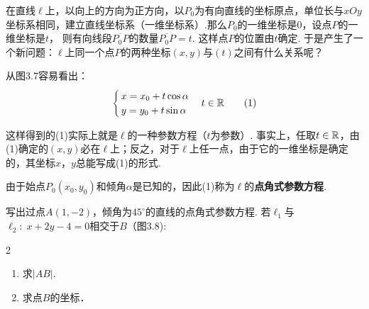 \noindent
\begin{minipage}{.52\textwidth}\CTEXindent
    在直线$\ell$上，以向上的方向为正方向，以$P_0$为有向直线的坐标原点，单位长与$xOy$坐标系相同，建立直线坐标系（一维坐标系）.那么$P_0$的一维坐标是0，设点$P$的一维坐标是$t$，
    则有向线段$\overline{P_0P}$的数量$\overline{P_0P}=t$. 这样点$P$的位置由$t$确定. 于是产生了一个新问题：$\ell$上同一个点$P$的两种坐标$(x,y)$与$(t)$之间有什么关系呢？
\end{minipage}
\hfill
\begin{minipage}{.45\textwidth}
\centering
{}
\end{minipage}

从图3.7容易看出：
\begin{equation}
    \begin{cases}
        x=x_0+t\cos\alpha\\
        y=y_0+t\sin\alpha
    \end{cases}t\in\mathbb{R}  \tag{1}
\end{equation}

这样得到的(1)实际上就是$\ell$的一种参数方程（$t$为参数）. 事实上，任取$t\in\mathbb{R}$，由(1)确定的$(x,y)$必在$\ell$上；反之，对于$\ell$上任一点，由于它的一维坐标是确定的，其坐标$x$，$y$总能写成(1)的形式.

由于始点$P_0(x_0,y_0)$和倾角$\alpha$是已知的，因此(1)称为$\ell$的\textbf{点角式参数方程}.

\begin{example}
写出过点$A(1,-2)$，倾角为$45^{\circ}$的直线的点角式参数方程. 若$\ell_1$与$\ell_2:\; x+2y-4=0$相交于$B$（图3.8):
\begin{multicols}{2}
    \begin{enumerate}[(1)]
        \item 求$|AB|$.
        \item 求点$B$的坐标．
    \end{enumerate}
\end{multicols}
\end{example}

